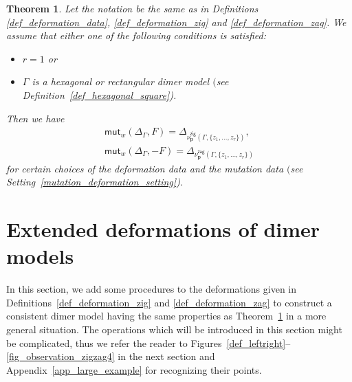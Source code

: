 \documentclass[11pt]{article}
\numberwithin{equation}{section}
\numberwithin{equation}{section}
\numberwithin{figure}{section}
\numberwithin{table}{section}
\newtheorem{Theorem}{Theorem}[section]
\newcommand{\bfp}{\mathbf{p}}
\newcommand{\zig}{\mathsf{zig}}
\newcommand{\zag}{\mathsf{zag}}
\newcommand{\mutation}{\mathsf{mut}}
\begin{document}
\setcounter{Theorem}{9}
\begin{Theorem}\label{mutation=deformation1}
Let the notation be the same as in Definitions {\rm \ref{def_deformation_data}}, {\rm \ref{def_deformation_zig}} and {\rm \ref{def_deformation_zag}}.
We assume that either one of the following conditions is satisfied:
\begin{itemize}\itemsep=0pt
\item[$(i)$] $r=1$ or
\item[$(ii)$] $\Gamma$ is a hexagonal or rectangular dimer model $($see Definition~{\rm \ref{def_hexagonal_square})}.
\end{itemize}
Then we have
\begin{gather*}
\mutation_{w}(\Delta_\Gamma,F)=\Delta_{\nu^\zig_\bfp(\Gamma,\{z_1,\dots,z_r\})},
\\
\mutation_{w}(\Delta_\Gamma,-F)=\Delta_{\nu^\zag_\bfp(\Gamma,\{z_1,\dots,z_r\})}
\end{gather*}
for certain choices of the deformation data and the mutation data $($see Setting~{\rm \ref{mutation_deformation_setting})}.
\end{Theorem}


\section{Extended deformations of dimer models}\label{sec_def_exdeform}

In this section, we add some procedures to the deformations given in Definitions~\ref{def_deformation_zig} and \ref{def_deformation_zag}
to construct a consistent dimer model having the same properties as Theorem~\ref{mutation=deformation1} in a more general situation.
The operations which will be introduced in this section might be complicated, thus we refer the reader to Figures~\ref{def_leftright}--\ref{fig_observation_zigzag4}
in the next section and Appendix~\ref{app_large_example} for recognizing their points.
\end{document}
